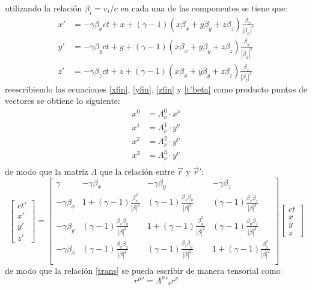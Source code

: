 \documentclass[12pt,letterpaper]{report}
\begin{document}
utilizando la relación $\beta_i = v_i/c$ en cada una de las componentes se tiene que:
\begin{align}
    \label{xfin}
    x'&=-\gamma \beta_x ct + x +(\gamma -1) (x\beta_x+y\beta_y+z\beta_z) \frac{\beta_x}{|\beta_x|^2}\\
    \label{zfin}
    y'&=-\gamma \beta_y ct + y +(\gamma -1) (x\beta_x+y\beta_y+z\beta_z) \frac{\beta_y}{|\beta_y|^2}\\
    \label{yfin}
    z'&=-\gamma \beta_z ct + z +(\gamma -1) (x\beta_x+y\beta_y+z\beta_z) \frac{\beta_z}{|\beta_z|^2}
\end{align}
reescribiendo las ecuaciones \ref{xfin}, \ref{yfin}, \ref{zfin} y \ref{t'beta} como producto puntos de vectores se obtiene lo siguiente:
\begin{align*}
    x^0&= \Lambda^0_\nu \cdot x^\nu \\
    x^1&= \Lambda^1_\nu \cdot y^\nu \\
    x^2&= \Lambda^2_\nu \cdot y^\nu \\
    x^3&= \Lambda^3_\nu \cdot y^\nu \\
\end{align*}
de modo que la matriz $\Lambda$ que la relación entre $\vec{r}$ y $\vec{r}'$:
\begin{equation}
    \begin{bmatrix}
        ct'\\ 
        x'\\ 
        y'\\ 
        z'
        \end{bmatrix}=
        \begin{bmatrix}
        \gamma &-\gamma \beta_x & -\gamma \beta_y & -\gamma \beta_z \\ 
        -\gamma \beta_x &1+(\gamma-1)\frac{\beta_x^2}{|\beta|^2}& (\gamma-1)\frac{\beta_x \beta_y}{|\beta|^2} &(\gamma-1)\frac{\beta_x \beta_z}{|\beta|^2}\\ 
        -\gamma \beta_y &(\gamma-1)\frac{\beta_x \beta_y}{|\beta|^2}& 1+(\gamma-1)\frac{\beta_y^2}{|\beta|^2} &(\gamma-1)\frac{\beta_y \beta_z}{|\beta|^2}\\ 
        -\gamma \beta_x &(\gamma-1)\frac{\beta_x \beta_z}{|\beta|^2}& (\gamma-1)\frac{\beta_z \beta_y}{|\beta|^2} &1+(\gamma-1)\frac{\beta_z^2}{|\beta|^2}\\ 
        \end{bmatrix} \begin{bmatrix}
        ct\\ 
        x\\ 
        y\\ 
        z
        \end{bmatrix}
        \label{trans}
\end{equation}
de modo que la relación \ref{trans} se pueda escribir de manera tensorial como
\begin{equation}
    {r^\mu}' = {\Lambda^\mu}'_\nu r^\nu
\end{equation}
\end{document}
